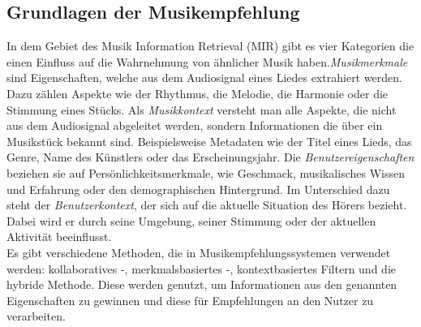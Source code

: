 \documentclass[twosided,a4,10pt]{article}
\begin{document}
\begin{multicols}{2}
		\section{Grundlagen der Musikempfehlung}
		In dem Gebiet des Musik Information Retrieval (MIR) gibt es vier Kategorien \cite{schedl} die einen Einfluss auf die Wahrnehmung von ähnlicher Musik haben.\newline \textit{Musikmerkmale} sind Eigenschaften, welche aus dem Audiosignal eines Liedes extrahiert werden. Dazu zählen Aspekte wie der Rhythmus, die Melodie, die Harmonie oder die Stimmung eines Stücks.\newline
		Als \textit{Musikkontext} versteht man alle Aspekte, die nicht aus dem Audiosignal abgeleitet werden, sondern Informationen die über ein Musikstück bekannt sind. Beispielsweise Metadaten wie der Titel eines Lieds, das Genre, Name des Künstlers oder das Erscheinungsjahr.\newline
		Die \textit{Benutzereigenschaften} beziehen sie auf Persönlichkeitsmerkmale, wie Geschmack, musikalisches Wissen und Erfahrung oder den demographischen Hintergrund.\newline
		Im Unterschied dazu steht der \textit{Benutzerkontext}, der sich auf die aktuelle Situation des Hörers bezieht. Dabei wird er durch seine Umgebung, seiner Stimmung oder der aktuellen Aktivität beeinflusst. \cite{knees}\newline\\
		Es gibt verschiedene Methoden, die in Musikempfehlungssystemen verwendet werden: kollaboratives -, merkmalsbasiertes -, kontextbasiertes Filtern und die hybride Methode. Diese werden genutzt, um Informationen aus den genannten Eigenschaften zu gewinnen und diese für Empfehlungen an den Nutzer zu verarbeiten. \cite{wang}

\end{multicols}
\end{document}
